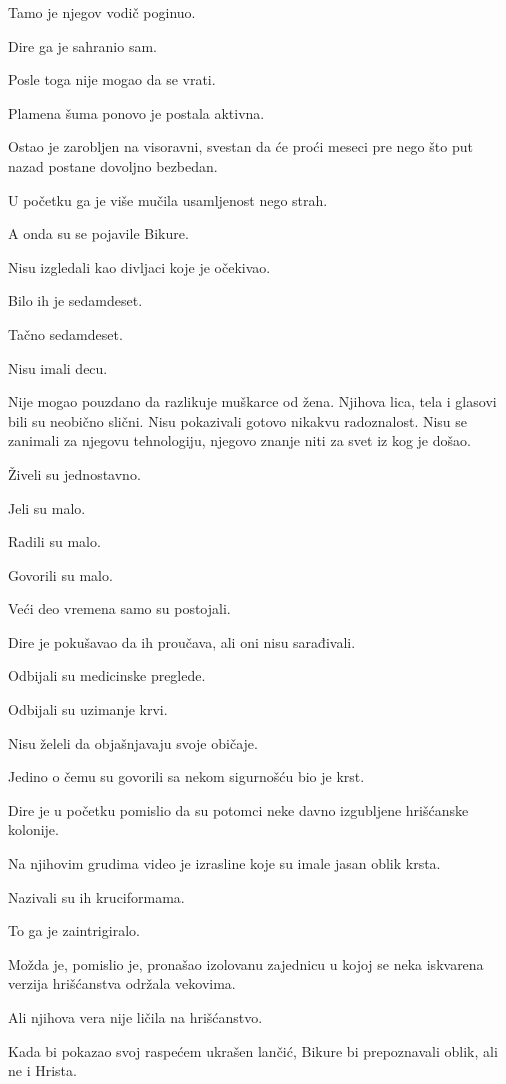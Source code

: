 Tamo je njegov vodič poginuo.

Dire ga je sahranio sam.

Posle toga nije mogao da se vrati.

Plamena šuma ponovo je postala aktivna.

Ostao je zarobljen na visoravni, svestan da će proći meseci pre nego što put nazad postane dovoljno bezbedan.

U početku ga je više mučila usamljenost nego strah.

A onda su se pojavile Bikure.

Nisu izgledali kao divljaci koje je očekivao.

Bilo ih je sedamdeset.

Tačno sedamdeset.

Nisu imali decu.

Nije mogao pouzdano da razlikuje muškarce od žena. Njihova lica, tela i glasovi bili su neobično slični. Nisu pokazivali gotovo nikakvu radoznalost. Nisu se zanimali za njegovu tehnologiju, njegovo znanje niti za svet iz kog je došao.

Živeli su jednostavno.

Jeli su malo.

Radili su malo.

Govorili su malo.

Veći deo vremena samo su postojali.

Dire je pokušavao da ih proučava, ali oni nisu sarađivali.

Odbijali su medicinske preglede.

Odbijali su uzimanje krvi.

Nisu želeli da objašnjavaju svoje običaje.

Jedino o čemu su govorili sa nekom sigurnošću bio je krst.

Dire je u početku pomislio da su potomci neke davno izgubljene hrišćanske kolonije.

Na njihovim grudima video je izrasline koje su imale jasan oblik krsta.

Nazivali su ih kruciformama.

To ga je zaintrigiralo.

Možda je, pomislio je, pronašao izolovanu zajednicu u kojoj se neka iskvarena verzija hrišćanstva održala vekovima.

Ali njihova vera nije ličila na hrišćanstvo.

Kada bi pokazao svoj raspećem ukrašen lančić, Bikure bi prepoznavali oblik, ali ne i Hrista.

